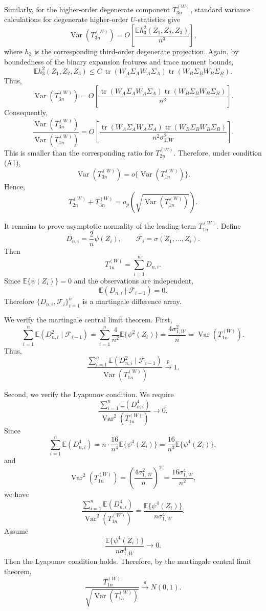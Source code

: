 \documentclass[12pt,reqno,oneside]{amsbook}
\theoremstyle{definition}
\theoremstyle{remark}
\begin{document}
Similarly, for the higher-order degenerate component $T_{3n}^{(W)}$, standard
variance calculations for degenerate higher-order $U$-statistics give
\[
\operatorname{Var}(T_{3n}^{(W)})
=
O\left[
\frac{
\mathbb E h_3^2(Z_1,Z_2,Z_3)
}{n^3}
\right],
\]
where $h_3$ is the corresponding third-order degenerate projection. Again, by
boundedness of the binary expansion features and trace moment bounds,
\[
\mathbb E h_3^2(Z_1,Z_2,Z_3)
\le
C\,
\operatorname{tr}(W_A\Sigma_AW_A\Sigma_A)
\operatorname{tr}(W_B\Sigma_BW_B\Sigma_B).
\]
Thus,
\[
\operatorname{Var}(T_{3n}^{(W)})
=
O\left[
\frac{
\operatorname{tr}(W_A\Sigma_AW_A\Sigma_A)
\operatorname{tr}(W_B\Sigma_BW_B\Sigma_B)
}{n^3}
\right].
\]
Consequently,
\[
\frac{
\operatorname{Var}(T_{3n}^{(W)})
}{
\operatorname{Var}(T_{1n}^{(W)})
}
=
O\left[
\frac{
\operatorname{tr}(W_A\Sigma_AW_A\Sigma_A)
\operatorname{tr}(W_B\Sigma_BW_B\Sigma_B)
}{
n^2\sigma_{1,W}^2
}
\right].
\]
This is smaller than the corresponding ratio for $T_{2n}^{(W)}$. Therefore,
under condition (A1),
\[
\operatorname{Var}(T_{3n}^{(W)})
=
o\{\operatorname{Var}(T_{1n}^{(W)})\}.
\]
Hence,
\[
T_{2n}^{(W)}+T_{3n}^{(W)}
=
o_p\left(
\sqrt{\operatorname{Var}(T_{1n}^{(W)})}
\right).
\]

It remains to prove asymptotic normality of the leading term
$T_{1n}^{(W)}$. Define
\[
D_{n,i}
=
\frac{2}{n}\psi(Z_i),
\qquad
\mathcal F_i=\sigma(Z_1,\ldots,Z_i).
\]
Then
\[
T_{1n}^{(W)}
=
\sum_{i=1}^n D_{n,i}.
\]
Since $\mathbb E\{\psi(Z_i)\}=0$ and the observations are independent,
\[
\mathbb E(D_{n,i}\mid \mathcal F_{i-1})=0.
\]
Therefore $\{D_{n,i},\mathcal F_i\}_{i=1}^n$ is a martingale difference array.

We verify the martingale central limit theorem. First,
\[
\sum_{i=1}^n
\mathbb E(D_{n,i}^2\mid \mathcal F_{i-1})
=
\sum_{i=1}^n
\frac{4}{n^2}\mathbb E\{\psi^2(Z_i)\}
=
\frac{4\sigma_{1,W}^2}{n}
=
\operatorname{Var}(T_{1n}^{(W)}).
\]
Thus,
\[
\frac{
\sum_{i=1}^n
\mathbb E(D_{n,i}^2\mid \mathcal F_{i-1})
}{
\operatorname{Var}(T_{1n}^{(W)})
}
\stackrel{p}{\longrightarrow}1.
\]

Second, we verify the Lyapunov condition. We require
\[
\frac{
\sum_{i=1}^n \mathbb E(D_{n,i}^4)
}{
\operatorname{Var}^2(T_{1n}^{(W)})
}
\to 0.
\]
Since
\[
\sum_{i=1}^n \mathbb E(D_{n,i}^4)
=
n\cdot \frac{16}{n^4}\mathbb E\{\psi^4(Z_i)\}
=
\frac{16}{n^3}\mathbb E\{\psi^4(Z_i)\},
\]
and
\[
\operatorname{Var}^2(T_{1n}^{(W)})
=
\left(\frac{4\sigma_{1,W}^2}{n}\right)^2
=
\frac{16\sigma_{1,W}^4}{n^2},
\]
we have
\[
\frac{
\sum_{i=1}^n \mathbb E(D_{n,i}^4)
}{
\operatorname{Var}^2(T_{1n}^{(W)})
}
=
\frac{
\mathbb E\{\psi^4(Z_i)\}
}{
n\sigma_{1,W}^4
}.
\]
Assume
\[
\frac{
\mathbb E\{\psi^4(Z_i)\}
}{
n\sigma_{1,W}^4
}
\to 0.
\tag{A2}
\]
Then the Lyapunov condition holds. Therefore, by the martingale central limit
theorem,
\[
\frac{
T_{1n}^{(W)}
}{
\sqrt{\operatorname{Var}(T_{1n}^{(W)})}
}
\stackrel{d}{\longrightarrow}
N(0,1).
\]
\end{document}
